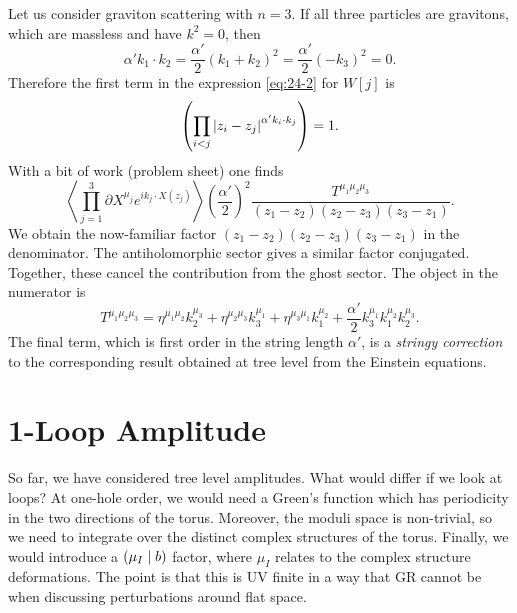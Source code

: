 \begin{example}
  Let us consider graviton scattering with $n = 3$.
  If all three particles are gravitons, which are massless and have $k^2 = 0$, then
  \begin{equation}
    \alpha' k_1 \cdot k_2 = \frac{\alpha'}{2} (k_1 + k_2)^2 = \frac{\alpha'}{2} (-k_3)^2 = 0.
  \end{equation}
  Therefore the first term in the expression \eqref{eq:24-2} for $W[j]$ is
  \begin{equation}
    \left( \prod_{i < j} \abs{z_i - z_j}^{\alpha' k_i \cdot k_j} \right) = 1.
  \end{equation}
  With a bit of work (problem sheet) one finds
  \begin{equation}
    \left\langle \prod_{j=1}^3 \partial X^{\mu_j} e^{i k_j \cdot X(z_j)} \right\rangle (\frac{\alpha'}{2})^2 \frac{T^{\mu_1 \mu_2 \mu_3}}{(z_1 - z_2)(z_2 - z_3) (z_3 - z_1)}.
  \end{equation}
  We obtain the now-familiar factor $(z_1 - z_2)(z_2 - z_3)(z_3 - z_1)$ in the denominator. The antiholomorphic sector gives a similar factor conjugated. Together, these cancel the contribution from the ghost sector.
  The object in the numerator is
  \begin{equation}
    \label{eq:stringycorrections}
    T^{\mu_1 \mu_2 \mu_3} = \eta^{\mu_1 \mu_2} k_2^{\mu_3} + \eta^{\mu_2 \mu_3} k_3^{\mu_1} + \eta^{\mu_3 \mu_1} k_1^{\mu_2} + \frac{\alpha'}{2} k_3^{\mu_1} k_1^{\mu_2} k_2^{\mu_3}.
  \end{equation}
  The final term, which is first order in the string length $\alpha'$, is a \emph{stringy correction} to the corresponding result obtained at tree level from the Einstein equations.
\end{example}

\section{1-Loop Amplitude}%
\label{sec:loop_amplitudes}

So far, we have considered tree level amplitudes. What would differ if we look at loops?
At one-hole order, we would need a Green's function which has periodicity in the two directions of the torus.
Moreover, the moduli space is non-trivial, so we need to integrate over the distinct complex structures of the torus. Finally, we would introduce a $(\mu_I \suchthat b)$ factor, where $\mu_I$ relates to the complex structure deformations. The point is that this is UV finite in a way that GR cannot be when discussing perturbations around flat space.

